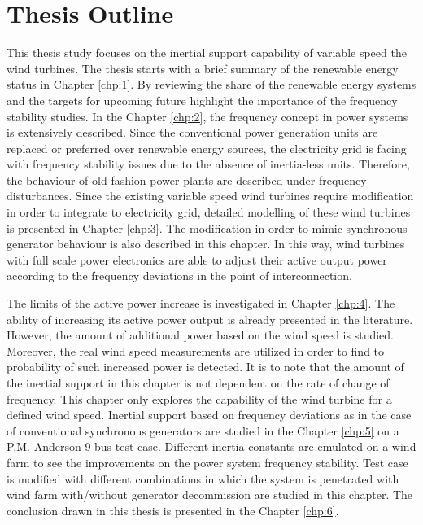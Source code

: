 \section{Thesis Outline}
This thesis study focuses on the inertial support capability of variable speed the wind turbines. The thesis starts with a brief summary of the renewable energy status in Chapter \ref{chp:1}. By reviewing the share of the renewable energy systems and the targets for upcoming future highlight the importance of the frequency stability studies. In the Chapter \ref{chp:2}, the frequency concept in power systems is extensively described. Since the conventional power generation units are replaced or preferred over renewable energy sources, the electricity grid is facing with frequency stability issues due to the absence of inertia-less units. Therefore, the behaviour of old-fashion power plants are described under frequency disturbances. Since the existing variable speed wind turbines require modification in order to integrate to electricity grid, detailed modelling of these wind turbines is presented in Chapter \ref{chp:3}. The modification in order to mimic synchronous generator behaviour is also described in this chapter. In this way, wind turbines with full scale power electronics are able to adjust their active output power according to the frequency deviations in the point of interconnection. \par
The limits of the active power increase is investigated in Chapter \ref{chp:4}. The ability of increasing its active power output is already presented in the literature. However, the amount of additional power based on the wind speed is studied. Moreover, the real wind speed measurements are utilized in order to find to probability of such increased power is detected. It is to note that the amount of the inertial support in this chapter is not dependent on the rate of change of frequency. This chapter only explores the capability of the wind turbine for a defined wind speed. Inertial support based on frequency deviations as in the case of conventional synchronous generators are studied in the Chapter \ref{chp:5} on a P.M. Anderson 9 bus test case. Different inertia constants are emulated on a wind farm to see the improvements on the power system frequency stability. Test case is modified with different combinations in which the system is penetrated with wind farm with/without generator decommission are studied in this chapter. The conclusion drawn in this thesis is presented in the Chapter \ref{chp:6}.


















